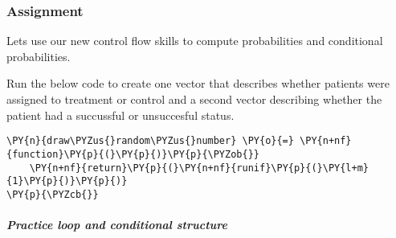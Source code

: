     \hypertarget{assignment}{%
\subsubsection{Assignment}\label{assignment}}

Lets use our new control flow skills to compute probabilities and
conditional probabilities.

    Run the below code to create one vector that describes whether patients
were assigned to treatment or control and a second vector describing
whether the patient had a succussful or unsuccesful status.

    \begin{tcolorbox}[breakable, size=fbox, boxrule=1pt, pad at break*=1mm,colback=cellbackground, colframe=cellborder]
\begin{Verbatim}[commandchars=\\\{\}]
\PY{n}{draw\PYZus{}random\PYZus{}number} \PY{o}{=} \PY{n+nf}{function}\PY{p}{(}\PY{p}{)}\PY{p}{\PYZob{}}
    \PY{n+nf}{return}\PY{p}{(}\PY{n+nf}{runif}\PY{p}{(}\PY{l+m}{1}\PY{p}{)}\PY{p}{)}
\PY{p}{\PYZcb{}}
\end{Verbatim}
\end{tcolorbox}

    \hypertarget{practice-loop-and-conditional-structure}{%
\subparagraph{Practice loop and conditional
structure}\label{practice-loop-and-conditional-structure}}

